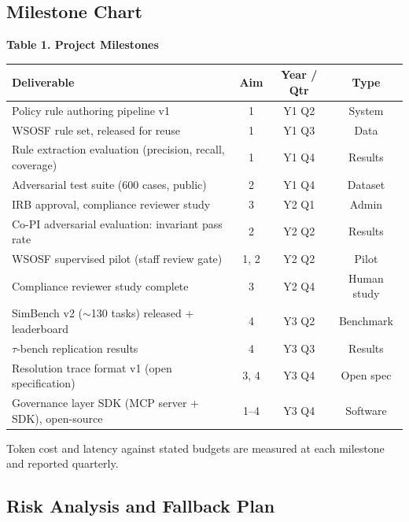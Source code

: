 \documentclass[11pt]{article}
\begin{document}
\subsection{Milestone Chart}

\noindent\textbf{Table 1. Project Milestones}

\vspace{4pt}
\begin{tabularx}{\textwidth}{Xccc}
\toprule
\textbf{Deliverable} & \textbf{Aim} & \textbf{Year / Qtr} & \textbf{Type} \\
\midrule
Policy rule authoring pipeline v1                          & 1    & Y1 Q2 & System \\
WSOSF rule set, released for reuse                         & 1    & Y1 Q3 & Data \\
Rule extraction evaluation (precision, recall, coverage)   & 1    & Y1 Q4 & Results \\
Adversarial test suite (600 cases, public)                 & 2    & Y1 Q4 & Dataset \\
IRB approval, compliance reviewer study                    & 3    & Y2 Q1 & Admin \\
Co-PI adversarial evaluation: invariant pass rate          & 2    & Y2 Q2 & Results \\
WSOSF supervised pilot (staff review gate)                 & 1, 2 & Y2 Q2 & Pilot \\
Compliance reviewer study complete                         & 3    & Y2 Q4 & Human study \\
SimBench v2 ($\sim$130 tasks) released + leaderboard       & 4    & Y3 Q2 & Benchmark \\
$\tau$-bench replication results                           & 4    & Y3 Q3 & Results \\
Resolution trace format v1 (open specification)            & 3, 4 & Y3 Q4 & Open spec \\
Governance layer SDK (MCP server + SDK), open-source       & 1--4 & Y3 Q4 & Software \\
\bottomrule
\end{tabularx}

\vspace{4pt}
Token cost and latency against stated budgets are measured at each milestone and reported quarterly.

\subsection{Risk Analysis and Fallback Plan}
\end{document}
